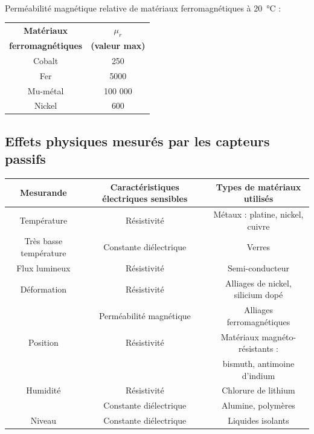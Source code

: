 \documentclass{article}
\begin{document}
\paragraph{}
Perméabilité magnétique relative de matériaux ferromagnétiques à \SI{20}{\celsius} :
\begin{table}[H]
    \centering
    \begin{tabular}{c c}
        \textbf{Matériaux} & \textbf{$\mu_r$}\\
        \textbf{ferromagnétiques} & \textbf{(valeur max)}\\
        \hline
        Cobalt & 250\\
        Fer & 5000\\
        Mu-métal & 100 000\\
        Nickel & 600\\
    \end{tabular}
\end{table}

\subsection{Effets physiques mesurés par les capteurs passifs}
\begin{table}[H]
    \centering
    \begin{tabular}{c c c}
        \textbf{Mesurande} & \textbf{Caractéristiques électriques sensibles} & \textbf{Types de matériaux utilisés}\\
        \hline
        Température & Résistivité & Métaux : platine, nickel, cuivre\\
        Très basse température & Constante diélectrique & Verres\\
        \hline
        Flux lumineux & Résistivité & Semi-conducteur\\
        \hline
        Déformation & Résistivité & Alliages de nickel, silicium dopé\\
        & Perméabilité magnétique & Alliages ferromagnétiques\\
        \hline
        Position & Résistivité & Matériaux magnéto-résistants :\\
         &  & bismuth, antimoine d'indium\\
        \hline
        Humidité & Résistivité & Chlorure de lithium\\
         & Constante diélectrique & Alumine, polymères\\
        \hline
        Niveau & Constante diélectrique & Liquides isolants\\
    \end{tabular}
\end{table}
\end{document}
